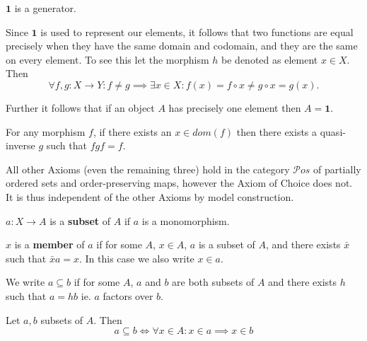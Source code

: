 \begin{axiom}
$\mathbf{1}$ is a generator.
\end{axiom}

\begin{remark}
Since $\mathbf{1}$ is used to represent our elements, it follows that two functions are equal precisely when they have the same domain and codomain, and they are the same on every element. To see this let the morphism $h$ be denoted as element $x \in X$. Then
\begin{equation*}
\forall f,g: X \longrightarrow Y: f \neq g \implies \exists x \in X : f(x) = f \circ x \neq g \circ x = g(x).
\end{equation*}

Further it follows that if an object $A$ has precisely one element then $A = \mathbf{1}$. 
\end{remark}

\begin{axiom}[AC]
For any morphism $f$, if there exists an $x \in dom(f)$ then there exists a quasi-inverse $g$ such that $fgf = f$.
\end{axiom}

\begin{remark}
All other Axioms (even the remaining three) hold in the category $\mathcal{P}os$ of partially ordered sets and order-preserving maps, however the Axiom of Choice does not. It is thus independent of the other Axioms by model construction. 
\end{remark}

\begin{definition}
$a:X \longrightarrow A$ is a \textbf{subset} of $A$ if $a$ is a monomorphism.

$x$ is a \textbf{member} of $a$ if for some $A$, $x \in A$, $a$ is a subset of $A$, and there exists $\bar{x}$ such that $\bar{x}a = x$. In this case we also write $x \in a$.

We write $a \subseteq b$ if for some $A$, $a$ and $b$ are both subsets of $A$ and there exists $h$ such that $a = hb$ ie. $a$ factors over $b$.
\end{definition}

\begin{theorem}
Let $a, b$ subsets of $A$. Then
\begin{equation}
a \subseteq b \iff \forall x \in A: x \in a \implies x \in b
\end{equation}
\end{theorem}

